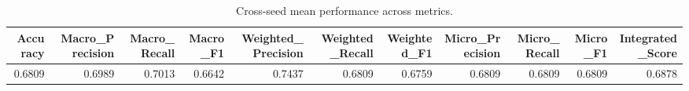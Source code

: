 \begin{table}[t]
\centering
\begin{tabular}{rrrrrrrrrrr}
\toprule
Accuracy & Macro_Precision & Macro_Recall & Macro_F1 & Weighted_Precision & Weighted_Recall & Weighted_F1 & Micro_Precision & Micro_Recall & Micro_F1 & Integrated_Score \\
\midrule
0.6809 & 0.6989 & 0.7013 & 0.6642 & 0.7437 & 0.6809 & 0.6759 & 0.6809 & 0.6809 & 0.6809 & 0.6878 \\
\bottomrule
\end{tabular}
\caption{Cross-seed mean performance across metrics.}
\label{tab:cross_seed_mean}
\end{table}